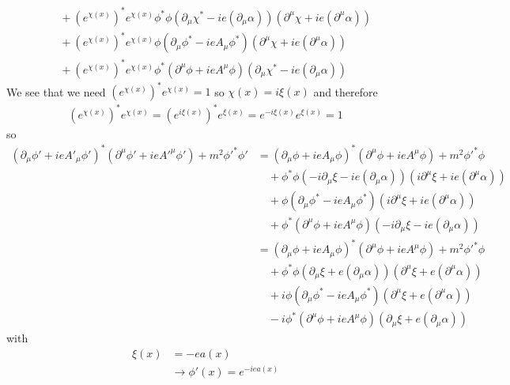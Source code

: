 \documentclass[../main.tex]{subfiles}
\begin{document}
\begin{enumerate}[(a)]
\begin{align}
&\quad+(e^{\chi(x)})^*e^{\chi(x)}
\phi^*\phi(\partial_\mu\chi^*-ie(\partial_\mu\alpha))(\partial^\mu\chi+ie(\partial^\mu\alpha))\\
&\quad+(e^{\chi(x)})^*e^{\chi(x)}
\phi(\partial_\mu\phi^*-ieA_\mu\phi^*)(\partial^\mu\chi+ie(\partial^\mu\alpha))\\
&\quad+(e^{\chi(x)})^*e^{\chi(x)}
\phi^*(\partial^\mu\phi+ieA^\mu\phi)(\partial_\mu\chi^*-ie(\partial_\mu\alpha))
\end{align}
We see that we need $(e^{\chi(x)})^*e^{\chi(x)}=1$ so $\chi(x)=i\xi(x)$ and therefore
\begin{align}
(e^{\chi(x)})^*e^{\chi(x)}=(e^{i\xi(x)})^*e^{\xi(x)}=e^{-i\xi(x)}e^{\xi(x)}=1
\end{align}
so
\begin{align*}
(\partial_\mu\phi'+ieA'_\mu\phi')^*(\partial^\mu\phi'+ieA'^\mu\phi')+m^2\phi'^*\phi'
&=(\partial_\mu\phi+ieA_\mu\phi)^*(\partial^\mu\phi+ieA^\mu\phi)+m^2\phi'^*\phi\\
&\quad+\phi^*\phi(-i\partial_\mu\xi-ie(\partial_\mu\alpha))(i\partial^\mu\xi+ie(\partial^\mu\alpha))\\
&\quad+\phi(\partial_\mu\phi^*-ieA_\mu\phi^*)(i\partial^\mu\xi+ie(\partial^\mu\alpha))\\
&\quad+\phi^*(\partial^\mu\phi+ieA^\mu\phi)(-i\partial_\mu\xi-ie(\partial_\mu\alpha))\\
&=(\partial_\mu\phi+ieA_\mu\phi)^*(\partial^\mu\phi+ieA^\mu\phi)+m^2\phi'^*\phi\\
&\quad+\phi^*\phi(\partial_\mu\xi+e(\partial_\mu\alpha))(\partial^\mu\xi+e(\partial^\mu\alpha))\\
&\quad+i\phi(\partial_\mu\phi^*-ieA_\mu\phi^*)(\partial^\mu\xi+e(\partial^\mu\alpha))\\
&\quad-i\phi^*(\partial^\mu\phi+ieA^\mu\phi)(\partial_\mu\xi+e(\partial_\mu\alpha))
\end{align*}
with
\begin{align}
\xi(x)&=-ea(x)\\
&\rightarrow \phi'(x)=e^{-iea(x)}
\end{align}


\end{enumerate}
\end{document}
